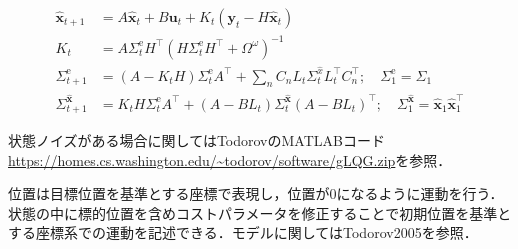\begin{align}
\hat{\mathbf{x}}_{t+1} &=A \hat{\mathbf{x}}_{t}+B \mathbf{u}_{t}+K_{t}\left(\mathbf{y}_{t}-H \hat{\mathbf{x}}_{t}\right) \\
K_{t} &=A \Sigma_{t}^{\mathrm{e}} H^\top\left(H \Sigma_{t}^{\mathrm{e}} H^\top+\Omega^{\omega}\right)^{-1} \\
\Sigma_{t+1}^{\mathrm{e}} &=\left(A-K_{t} H\right) \Sigma_{t}^{\mathrm{e}} A^\top+\sum_{n} C_{n} L_{t} \Sigma_{t}^{\hat{x}} L_{t}^\top C_{n}^\top ; \quad \Sigma_{1}^{\mathrm{e}}=\Sigma_{1} \\
\Sigma_{t+1}^{\hat{\mathbf{x}}} &=K_{t} H \Sigma_{t}^{\mathrm{e}} A^\top+\left(A-B L_{t}\right) \Sigma_{t}^{\hat{\mathbf{x}}}\left(A-B L_{t}\right)^\top ; \quad \Sigma_{1}^{\hat{\mathbf{x}}}=\hat{\mathbf{x}}_{1} \hat{\mathbf{x}}_{1}^\top
\end{align}

状態ノイズがある場合に関してはTodorovのMATLABコード \url{https://homes.cs.washington.edu/~todorov/software/gLQG.zip}を参照．

位置は目標位置を基準とする座標で表現し，位置が0になるように運動を行う．状態の中に標的位置を含めコストパラメータを修正することで初期位置を基準とする座標系での運動を記述できる．モデルに関してはTodorov2005を参照．







